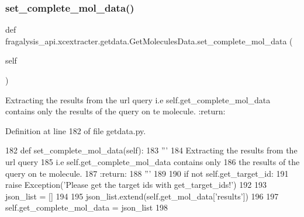 \subsubsection{\texorpdfstring{set\+\_\+complete\+\_\+mol\+\_\+data()}{set\_complete\_mol\_data()}}
{\footnotesize\ttfamily def fragalysis\+\_\+api.\+xcextracter.\+getdata.\+Get\+Molecules\+Data.\+set\+\_\+complete\+\_\+mol\+\_\+data (\begin{DoxyParamCaption}\item[{}]{self }\end{DoxyParamCaption})}

\begin{DoxyVerb}Extracting the results from the url query
i.e self.get_complete_mol_data contains only
the results of the query on te molecule.
:return:
\end{DoxyVerb}
 

Definition at line 182 of file getdata.\+py.


\begin{DoxyCode}
182     \textcolor{keyword}{def }set\_complete\_mol\_data(self):
183         \textcolor{stringliteral}{'''}
184 \textcolor{stringliteral}{        Extracting the results from the url query}
185 \textcolor{stringliteral}{        i.e self.get\_complete\_mol\_data contains only}
186 \textcolor{stringliteral}{        the results of the query on te molecule.}
187 \textcolor{stringliteral}{        :return:}
188 \textcolor{stringliteral}{        '''}
189 
190         \textcolor{keywordflow}{if} \textcolor{keywordflow}{not} self.get\_target\_id:
191             \textcolor{keywordflow}{raise} Exception(\textcolor{stringliteral}{'Please get the target ids with get\_target\_ids!'})
192 
193         json\_list = []
194 
195         json\_list.extend(self.get\_mol\_data[\textcolor{stringliteral}{'results'}])
196 
197         self.get\_complete\_mol\_data = json\_list
198         
\end{DoxyCode}
\mbox{\label{classfragalysis__api_1_1xcextracter_1_1getdata_1_1_get_molecules_data_ab1f0b5b8edbd496d800e08c7f8758a53}} 
